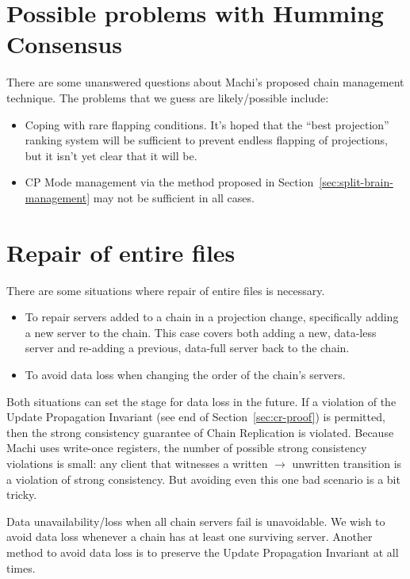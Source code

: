 \documentclass[preprint,10pt]{sigplanconf}
\begin{document}
\section{Possible problems with Humming Consensus}

There are some unanswered questions about Machi's proposed chain
management technique.  The problems that we guess are likely/possible
include:

\begin{itemize}

\item Coping with rare flapping conditions.
  It's hoped that the ``best projection'' ranking system
  will be sufficient to prevent endless flapping of projections, but
  it isn't yet clear that it will be.

\item CP Mode management via the method proposed in
  Section~\ref{sec:split-brain-management} may not be sufficient in
  all cases.

\end{itemize}

\section{Repair of entire files}
\label{sec:repair-entire-files}

There are some situations where repair of entire files is necessary.

\begin{itemize}
\item To repair servers added to a chain in a projection change,
  specifically adding a new server to the chain.  This case covers both
  adding a new, data-less server and re-adding a previous, data-full server
  back to the chain.
\item To avoid data loss when changing the order of the chain's servers.
\end{itemize}

Both situations can set the stage for data loss in the future.
If a violation of the Update Propagation Invariant (see end of
Section~\ref{sec:cr-proof}) is permitted, then the strong consistency
guarantee of Chain Replication is violated.  Because Machi uses
write-once registers, the number of possible strong consistency
violations is small: any client that witnesses a written $\rightarrow$
unwritten transition is a violation of strong consistency.  But
avoiding even this one bad scenario is a bit tricky.

Data
unavailability/loss when all chain servers fail is unavoidable.  We
wish to avoid data loss whenever a chain has at least one surviving
server.  Another method to avoid data loss is to preserve the Update
Propagation Invariant at all times.
\end{document}
